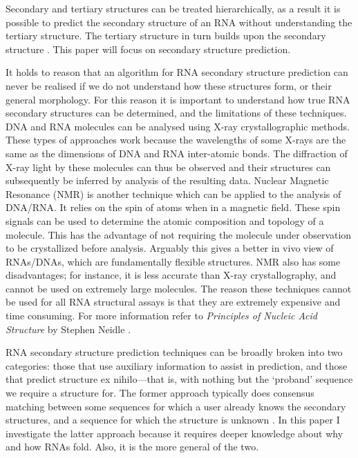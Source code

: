 \documentclass{cshonours}
\begin{document}
Secondary and tertiary structures can be treated hierarchically, as a result it is possible to predict the secondary structure of an RNA without understanding the tertiary structure. The tertiary structure in turn builds upon the secondary structure \cite{tinoco1999rna}. This paper will focus on secondary structure prediction.

It holds to reason that an algorithm for RNA secondary structure prediction can never be realised if we do not understand how these structures form, or their general morphology. For this reason it is important to understand how true RNA secondary structures can be determined, and the limitations of these techniques. DNA and RNA molecules can be analysed using X-ray crystallographic methods. These types of approaches work because the wavelengths of some X-rays are the same as the dimensions of DNA and RNA inter-atomic bonds. The diffraction of X-ray light by these molecules can thus be observed and their structures can subsequently be inferred by analysis of the resulting data. Nuclear Magnetic Resonance (NMR) is another technique which can be applied to the analysis of DNA/RNA. It relies on the spin of atoms when in a magnetic field. These spin signals can be used to determine the atomic composition and topology of a molecule. This has the advantage of not requiring the molecule under observation to be crystallized before analysis. Arguably this gives a better in vivo view of RNAs/DNAs, which are fundamentally flexible structures. NMR also has some disadvantages; for instance, it is less accurate than X-ray crystallography, and cannot be used on extremely large molecules. The reason these techniques cannot be used for all RNA structural assays is that they are extremely expensive and time consuming. For more information refer to \emph{Principles of Nucleic Acid Structure} by Stephen Neidle \cite{neidle2010principles}.


RNA secondary structure prediction techniques can be broadly broken into two categories: those that use auxiliary information to assist in prediction, and those that predict structure ex nihilo---that is, with nothing but the `proband' sequence we require a structure for. The former approach typically does consensus matching between some sequences for which a user already knows the secondary structures, and a sequence for which the structure is unknown \cite{hofacker2008rna}. In this paper I investigate the latter approach because it requires deeper knowledge about why and how RNAs fold. Also, it is the more general of the two.
\end{document}
